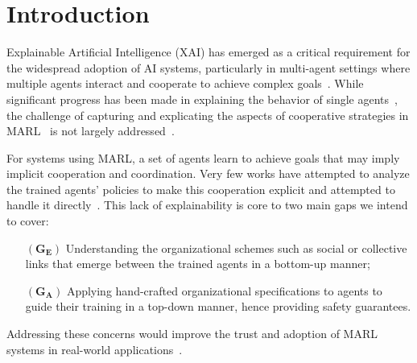 \documentclass[runningheads]{llncs}
\begin{document}





\section{Introduction}

Explainable Artificial Intelligence (XAI) has emerged as a critical requirement for the widespread adoption of AI systems, particularly in multi-agent settings where multiple agents interact and cooperate to achieve complex goals~\cite{doshivelez2017rigorous,gunning2019xai}. While significant progress has been made in explaining the behavior of single agents~\cite{ribeiro2016classifier,lundberg2017unified}, the challenge of capturing and explicating the aspects of cooperative strategies in MARL~\cite{busoniu2008survey} is not largely addressed~\cite{kok2006collaborative,omidshafiei2019learning}.

For systems using MARL, a set of agents learn to achieve goals that may imply implicit cooperation and coordination. Very few works have attempted to analyze the trained agents' policies to make this cooperation explicit and attempted to handle it directly~\cite{albrecht2018survey,perolat2017pool}. This lack of explainability is core to two main gaps we intend to cover:
%
\begin{itemize}[wide, labelsep = 1em]
    \item[$(\mathbf{G_E})$] Understanding the organizational schemes such as social or collective links that emerge between the trained agents in a bottom-up manner;
    \item[$(\mathbf{G_A})$] Applying hand-crafted organizational specifications to agents to guide their training in a top-down manner, hence providing safety guarantees.
\end{itemize}
%
Addressing these concerns would improve the trust and adoption of MARL systems in real-world applications~\cite{kok2006collaborative,omidshafiei2019learning}.
\end{document}

